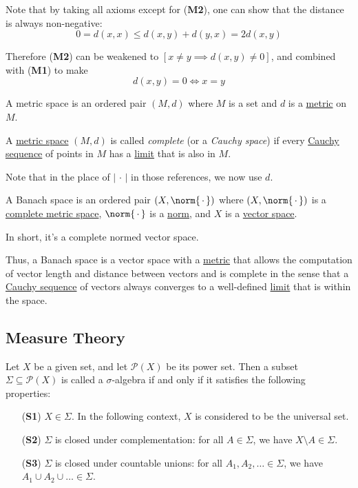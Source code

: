 Note that by taking all axioms except for (\textbf{M2}), one can show that the
distance is always non-negative:
$$
  0=d(x,x)\leq d(x,y)+d(y,x)=2d(x,y)
$$

Therefore (\textbf{M2}) can be weakened to $[x\neq y\implies d(x,y)\neq0]$, and
combined with (\textbf{M1}) to make
$$
  d(x,y)=0\iff x=y
$$

\label{dfe585e}

A metric space is an ordered pair $(M,d)$ where $M$ is a set and $d$ is a
\href{d23883d}{metric} on $M$.

\label{beab911}

A \href{dfe585e}{metric space} $(M,d)$ is called \textit{complete} (or a
\textit{Cauchy space}) if every \href{a8f670d}{Cauchy sequence} of points in
$M$ has a \href{e565120}{limit} that is also in $M$.

Note that in the place of $\left|\,\cdot\,\right|$ in those references, we now
use $d$.

\label{f894cb0}

A Banach space is an ordered pair $(X,\norm{\,\cdot\,})$ where
$(X,\norm{\,\cdot\,})$ is a \href{beab911}{complete metric space},
$\norm{\,\cdot\,}$ is a \href{e0fff96}{norm}, and $X$ is a
\href{fc83050}{vector space}.

In short, it's a complete normed vector space.

Thus, a Banach space is a vector space with a \href{dfe585e}{metric} that
allows the computation of vector length and distance between vectors and is
complete in the sense that a \href{a8f670d}{Cauchy sequence} of vectors always
converges to a well-defined \href{e565120}{limit} that is within the space.

\subsection{Measure Theory}\label{d08d5ae}

\label{da9a47a}

Let $X$ be a given set, and let $\mathcal P(X)$ be its power set. Then a subset
$\Sigma\subseteq\mathcal P(X)$ is called a $\sigma$-algebra if and only if it
satisfies the following properties:
\begin{itemize}
  \item[(\textbf{S1})] $X\in\Sigma$. In the following context, $X$ is considered
        to be the universal set.
  \item[(\textbf{S2})] $\Sigma$ is closed under complementation: for all
        $A\in\Sigma$, we have $X\setminus A\in\Sigma$.
  \item[(\textbf{S3})] $\Sigma$ is closed under countable unions: for all
        $A_1,A_2,\ldots\in\Sigma$, we have $A_1\cup A_2\cup\ldots\in\Sigma$.
\end{itemize}

